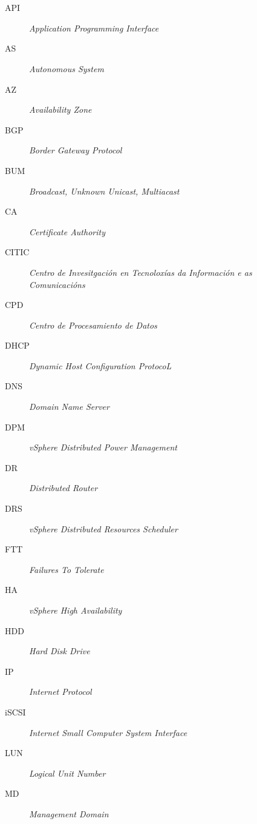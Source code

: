 \chapter*{\nomeglosarioacronimos}
\label{chap:acronimos}


\begin{description}
 \item [API] \emph{Application Programming Interface}
 \item [AS] \emph{Autonomous System}
 \item [AZ] \emph{Availability Zone}
 \item [BGP] \emph{Border Gateway Protocol}
 \item [BUM] \emph{Broadcast, Unknown Unicast, Multiacast}
 \item [CA] \emph{Certificate Authority}
 \item [CITIC] \emph{Centro de Invesitgación en Tecnoloxías da Información e as Comunicacións}
 \item [CPD] \emph{Centro de Procesamiento de Datos}
 \item [DHCP] \emph{Dynamic Host Configuration ProtocoL}
 \item [DNS] \emph{Domain Name Server}
 \item [DPM] \emph{vSphere Distributed Power Management}
 \item [DR] \emph{Distributed Router}
 \item [DRS] \emph{vSphere Distributed Resources Scheduler}
 \item [FTT] \emph{Failures To Tolerate}
 \item [HA] \emph{vSphere High Availability}
 \item [HDD] \emph{Hard Disk Drive}
 \item [IP] \emph{Internet Protocol}
 \item [iSCSI] \emph{Internet Small Computer System Interface}
 \item [LUN] \emph{Logical Unit Number}
 \item [MD] \emph{Management Domain}

\end{description}

